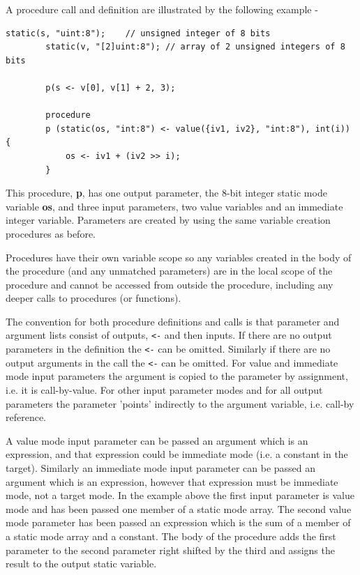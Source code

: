 \documentclass[10pt,a4paper,twoside,fleqn]{article}
\newcommand{\var}[1]{{\bf #1}} %
\begin{document}
    A procedure call and definition are illustrated by the following example -
    \begin{lstlisting}[language=threepl]
        static(s, "uint:8");    // unsigned integer of 8 bits
        static(v, "[2]uint:8"); // array of 2 unsigned integers of 8 bits
        
        p(s <- v[0], v[1] + 2, 3);
        
        procedure
        p (static(os, "int:8") <- value({iv1, iv2}, "int:8"), int(i)) {
            os <- iv1 + (iv2 >> i);
        }
    \end{lstlisting}
    This procedure, \var{p}, has one output parameter, the 8-bit integer
    static mode variable \var{os}, and three input parameters, two
    value variables and an immediate integer variable. Parameters are created
    by using the same variable creation procedures as before.
    
    Procedures have their own variable scope so any variables created in the
    body of the procedure (and any unmatched parameters) are in the local
    scope of the procedure and cannot be accessed from outside the procedure,
    including any deeper calls to procedures (or functions).
    
    The convention for both procedure definitions and calls is that parameter and
    argument lists consist of outputs, \verb'<-' and then inputs. If there are no
    output parameters in the definition the \verb'<-' can be omitted. Similarly if
    there are no output arguments in the call the \verb'<-' can be omitted. For
    value and immediate mode input parameters the argument is copied to the
    parameter by assignment, i.e. it is call-by-value. For other input parameter
    modes and for all output parameters the parameter 'points' indirectly to the
    argument variable, i.e. call-by reference.
    
    A value mode input parameter can be passed an argument which is an expression,
    and that expression could be immediate mode (i.e. a constant in the target).
    Similarly an immediate mode input parameter can be passed an argument which
    is an expression, however that expression must be immediate mode, not a
    target mode. In the example above the first input parameter is value mode
    and has been passed one member of a static mode array. The second value
    mode parameter has been passed an expression which is the sum of a
    member of a static mode array and a constant. The body of the procedure
    adds the first parameter to the second parameter right shifted by the
    third and assigns the result to the output static variable.
    
\end{document}
